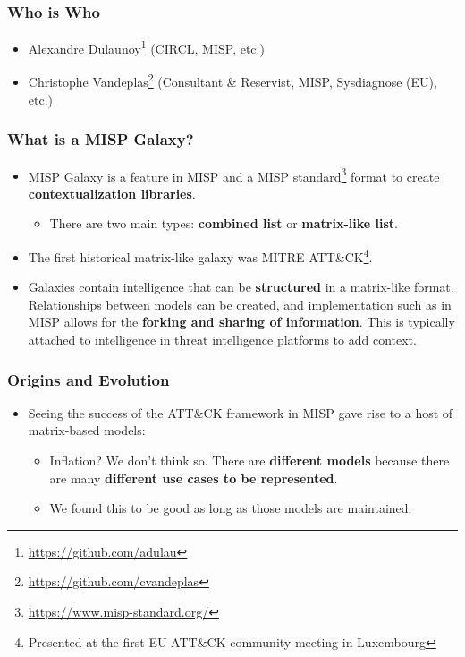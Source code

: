 
\begin{frame}
\titlepage
\end{frame}

\begin{frame}
        \frametitle{Who is Who}
        \begin{itemize}
            \item Alexandre Dulaunoy\footnote{\url{https://github.com/adulau}} (CIRCL, MISP, etc.)
            \item Christophe Vandeplas\footnote{\url{https://github.com/cvandeplas}} (Consultant \& Reservist, MISP, Sysdiagnose (EU), etc.)
        \end{itemize}
\end{frame}

\begin{frame}
  \frametitle{What is a MISP Galaxy?}
  \begin{itemize}
	  \item MISP Galaxy is a feature in MISP and a MISP standard\footnote{\url{https://www.misp-standard.org/}} format to create {\bf contextualization libraries}.
    \begin{itemize}
      \item There are two main types: \textbf{combined list} or \textbf{matrix-like list}.
    \end{itemize}
    \item The first historical matrix-like galaxy was MITRE ATT\&CK\footnote{Presented at the first EU ATT\&CK community meeting in Luxembourg}.
    \item Galaxies contain intelligence that can be \textbf{structured} in a matrix-like format. Relationships between models can be created, and implementation such as in MISP allows for the \textbf{forking and sharing of information}. This is typically attached to intelligence in threat intelligence platforms to add context.
  \end{itemize}
\end{frame}


\begin{frame}
   \frametitle{Origins and Evolution}
   \begin{itemize}
       \item Seeing the success of the ATT\&CK framework in MISP gave rise to a host of matrix-based models:
       \begin{itemize}
           \item Inflation? We don’t think so. There are {\bf different models} because there are many {\bf different use cases to be represented}.
           \item We found this to be good as long as those models are maintained.
       \end{itemize}
   \end{itemize}
\end{frame}

